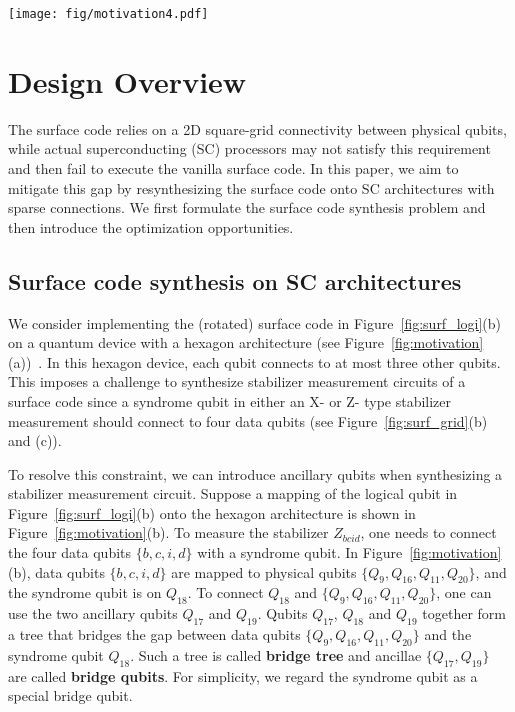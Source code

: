 
\begin{figure*}[ht!]
    \centering
    \texttt{[image: fig/motivation4.pdf]}
    \caption{ A motivating example for synthesizing a (rotated) distance-3 surface code: (a) An SC device based on the hexagon structure; (b) A bad data qubit layout where the stabilizer $X_{idfe}$ cannot be measured; (c) A promising data qubit layout that ensures stabilizer measurement for all stabilizers; (d) An example for resolving bridge tree conflict. }
    \label{fig:motivation}
\end{figure*}

\section{Design Overview}
\label{sect: design_over}
The surface code relies on a 2D square-grid connectivity between physical qubits, while actual superconducting (SC) processors may not satisfy this requirement and then fail to execute the vanilla surface code.
In this paper, we aim to mitigate this gap by resynthesizing the surface code onto SC architectures with sparse connections.
We first formulate the surface code synthesis problem and then introduce the optimization opportunities.



\subsection{Surface code synthesis on SC architectures}

We consider implementing the (rotated) surface code in Figure~\ref{fig:surf_logi}(b) on a quantum device with a hexagon architecture (see Figure~\ref{fig:motivation}(a))~\cite{Chamberland2020TopologicalAS}. In this hexagon device, each qubit connects to at most three other qubits.
This imposes a challenge to synthesize stabilizer measurement circuits of a surface code since a syndrome qubit in either an X- or Z- type stabilizer measurement should connect to four data qubits (see Figure~\ref{fig:surf_grid}(b) and (c)).

To resolve this constraint, we can introduce ancillary qubits when synthesizing a stabilizer measurement circuit.
Suppose a mapping of the logical qubit in Figure~\ref{fig:surf_logi}(b) onto the hexagon architecture  is shown in Figure~\ref{fig:motivation}(b). 
To measure the stabilizer $Z_{bcid}$, one needs to connect the four data qubits $\{b,c,i,d\}$ with a syndrome qubit. 
In Figure~\ref{fig:motivation}(b), %
data qubits $\{b, c, i, d\}$ are mapped to physical qubits $\{Q_9, Q_{16}, Q_{11}, Q_{20}\}$, and %
the syndrome qubit is on $Q_{18}$.
To connect $Q_{18}$ and $\{Q_9, Q_{16}, Q_{11}, Q_{20}\}$, one can use the two ancillary qubits $Q_{17}$ and $Q_{19}$.
Qubits $Q_{17}$, $Q_{18}$ and $Q_{19}$ together form a tree that bridges the gap between data qubits $\{Q_9, Q_{16}, Q_{11}, Q_{20}\}$ and the syndrome qubit $Q_{18}$. Such a tree is called \textbf{bridge tree} and ancillae $\{Q_{17}, Q_{19}\}$ are called \textbf{bridge qubits}. For simplicity, we regard the syndrome qubit as a special bridge qubit. 


